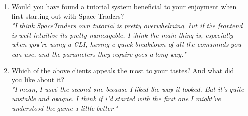 \begin{enumerate}
    \item Would you have found a tutorial system beneficial to your enjoyment when first starting out with Space Traders? \\
        \textit{"I think SpaceTraders own tutorial is pretty overwhelming, but if the frontend is well intuitive its pretty maneagable. I think the main thing is, especially when you're using a CLI, having a quick breakdown of all the comamnds you can use, and the parameters they require goes a long way."}
    \item Which of the above clients appeals the most to your tastes? And what did you like about it?\\
        \textit{"I mean, I used the second one because I liked the way it looked. But it's quite unstable and opaque. I think if i'd started with the first one I might've understood the game a little better."}
\end{enumerate}

